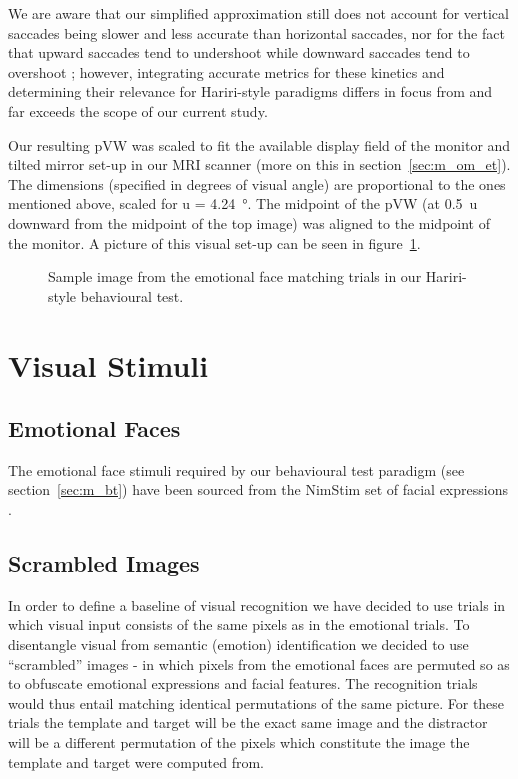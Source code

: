 	We are aware that our simplified approximation still does not account for vertical saccades being slower\cite{TerryBahill1975} and less accurate\cite{Collewijn1988} than horizontal saccades, 
	nor for the fact that upward saccades tend to undershoot while downward saccades tend to overshoot \cite{Collewijn1988};
	however, integrating accurate metrics for these kinetics and determining their relevance for Hariri-style paradigms differs in focus from and far exceeds the scope of our current study.
	
	Our resulting pVW was scaled to fit the available display field of the monitor and tilted mirror set-up in our MRI scanner (more on this in section~\ref{sec:m_om_et}).
	The dimensions (specified in degrees of visual angle) are proportional to the ones mentioned above, scaled for u = \SI{4.24}{\degree}.
	The midpoint of the pVW (at \SI{0.5}{u} downward from the midpoint of the top image) was aligned to the midpoint of the monitor.
	A picture of this visual set-up can be seen in figure~\ref{fig:m_b_2}.
	
	\begin{figure}[!h]
	    \caption{Sample image from the emotional face matching trials in our Hariri-style behavioural test.}
	    \label{fig:m_b_2}
	\end{figure}
		    
    \section{Visual Stimuli}
	\subsection{Emotional Faces}\label{sec:m_vs_ef}
	    The emotional face stimuli required by our behavioural test paradigm (see section~\ref{sec:m_bt}) have been sourced from the NimStim set of facial expressions \cite{Tottenham2009}.
	\subsection{Scrambled Images}\label{sec:m_vs_si}
	    In order to define a baseline of visual recognition we have decided to use trials in which visual input consists of the same pixels as in the emotional trials. 
	    To disentangle visual from semantic (emotion) identification we decided to use “scrambled” images - in which pixels from the emotional faces are permuted so as to obfuscate emotional expressions and facial features.
	    The recognition trials would thus entail matching identical permutations of the same picture.
	    For these trials the template and target will be the exact same image and the distractor will be a different permutation of the pixels which constitute the image the template and target were computed from. 
	    
